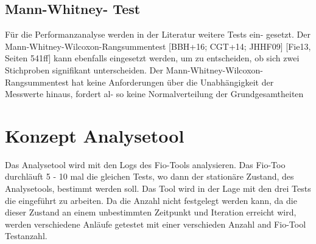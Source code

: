 \subsection{Mann-Whitney-
Test}
Für die Performanzanalyse werden in der Literatur weitere Tests ein-
gesetzt. Der Mann-Whitney-Wilcoxon-Rangsummentest [BBH+16; CGT+14; JHHF09]
[Fie13, Seiten 541ff] kann ebenfalls eingesetzt werden, um zu entscheiden, ob sich zwei
Stichproben signifikant unterscheiden. Der Mann-Whitney-Wilcoxon-Rangsummentest
hat keine Anforderungen über die Unabhängigkeit der Messwerte hinaus, fordert al-
so keine Normalverteilung der Grundgesamtheiten

\section{Konzept Analysetool}
Das Analysetool wird mit den Logs des Fio-Tools analysieren.
Das Fio-Too durchläuft 5 - 10 mal die gleichen Tests, wo dann der stationäre Zustand, des Analysetools,
bestimmt werden soll. Das Tool wird in der Lage mit den drei Tests die eingeführt zu arbeiten.
Da die Anzahl nicht festgelegt werden kann, da die dieser Zustand an einem unbestimmten Zeitpunkt und Iteration erreicht wird,
werden verschiedene Anläufe getestet mit einer verschieden Anzahl and Fio-Tool Testanzahl.